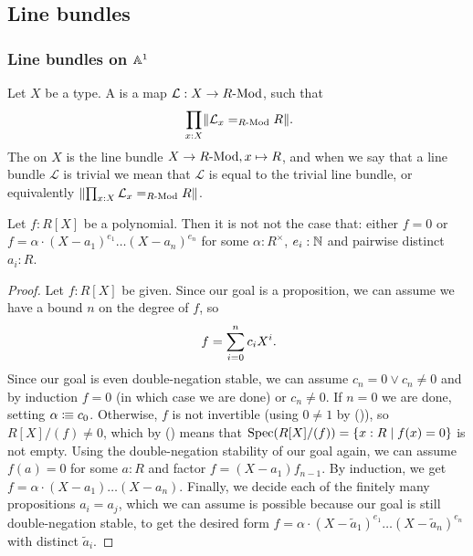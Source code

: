 \subsection{Line bundles}

\subsubsection{Line bundles on $\mathbb{A}^1$}

\begin{definition}%
  Let $X$ be a type.
  A  is a map $\mathcal L : X\to R\text{-}\mathrm{Mod}$,
  such that
  \[ \prod_{x:X} \propTrunc{\mathcal L_x=_{\Mod{R}}R} \rlap{.}\]
  The  on $X$ is the line bundle
  $X \to R\text{-}\mathrm{Mod}, x \mapsto R$,
  and when we say that a line bundle $\mathcal{L}$ is trivial
  we mean that $\mathcal{L}$ is equal to the trivial line bundle,
  or equivalently $\lVert \prod_{x:X} \mathcal L_x=_{R\text{-}\mathrm{Mod}}R \rVert$.
\end{definition}

\begin{lemma}%
  \label{polynomials-notnot-decompose}
  Let $f : R[X]$ be a polynomial.
  Then it is not not the case that:
  either $f = 0$ or
  $f = \alpha \cdot {(X - a_1)}^{e_1} \dots {(X - a_n)}^{e_n}$
  for some $\alpha : R^\times$,
  $e_i : \mathbb{N}$ and pairwise distinct $a_i : R$.
\end{lemma}

\begin{proof}
  Let $f : R[X]$ be given.
  Since our goal is a proposition,
  we can assume we have a bound $n$ on the degree of $f$,
  so
  \[ f = \sum_{i = 0}^n c_i X^i \rlap{.} \]
  Since our goal is even double-negation stable,
  we can assume $c_n = 0 \lor c_n \neq 0$
  and by induction $f = 0$ (in which case we are done)
  or $c_n \neq 0$.
  If $n = 0$ we are done,
  setting $\alpha \vcentcolon\mspace{-1.2mu}\equiv c_0$.
  Otherwise,
  $f$ is not invertible (using $0 \neq 1$ by ()),
  so $R[X]/(f) \neq 0$,
  which by () means that
  $\operatorname{Spec}(R[X]/(f)) = \{ x : R \mid f(x) = 0 \}$
  is not empty.
  Using the double-negation stability of our goal again,
  we can assume $f(a) = 0$ for some $a : R$
  and factor $f = (X - a_1) f_{n - 1}$.
  By induction, we get $f = \alpha \cdot (X - a_1) \dots (X - a_n)$.
  Finally, we decide each of the finitely many propositions $a_i = a_j$,
  which we can assume is possible
  because our goal is still double-negation stable,
  to get the desired form
  $f = \alpha \cdot {(X - \widetilde{a}_1)}^{e_1} \dots {(X - \widetilde{a}_n)}^{e_n}$
  with distinct $\widetilde{a}_i$.
\end{proof}

